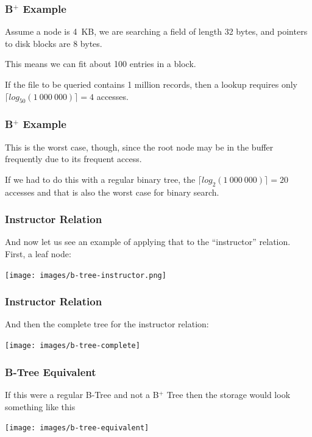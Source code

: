 \begin{frame}
\frametitle{B$^{+}$ Example}

Assume a node is 4~KB, we are searching a field of length 32 bytes, and pointers to disk blocks are 8 bytes. 

This means we can fit about 100 entries in a block. 

If the file to be queried contains 1 million records, then a lookup requires only $\lceil log_{50}(1~000~000) \rceil = 4$ accesses. 
\end{frame}

\begin{frame}
\frametitle{B$^{+}$ Example}

This is the worst case, though, since the root node may be in the buffer frequently due to its frequent access. 

If we had to do this with a regular binary tree, the $\lceil log_{2}(1~000~000) \rceil = 20$ accesses and that is also the worst case for binary search.


\end{frame}

\begin{frame}
\frametitle{Instructor Relation}

And now let us see an example of applying that to the ``instructor'' relation. First, a leaf node:

\begin{center}
	\texttt{[image: images/b-tree-instructor.png]}
\end{center}

\end{frame}

\begin{frame}
\frametitle{Instructor Relation}

And then the complete tree for the instructor relation:

\begin{center}
	\texttt{[image: images/b-tree-complete]}
\end{center}

\end{frame}



\begin{frame}
\frametitle{B-Tree Equivalent}

If this were a regular B-Tree and not a B$^{+}$ Tree then the storage would look something like this

\begin{center}
	\texttt{[image: images/b-tree-equivalent]}
\end{center}

\end{frame}

